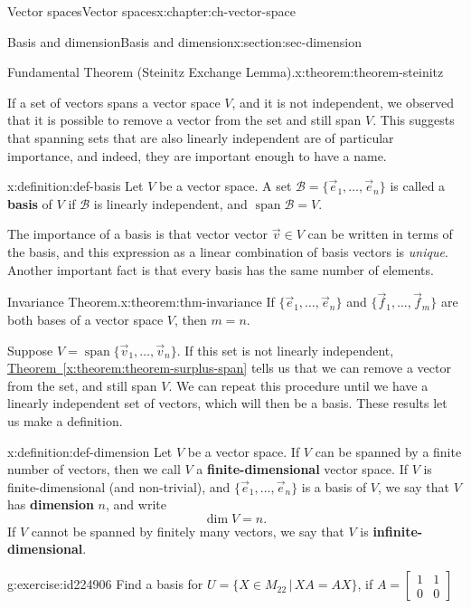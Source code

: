 \documentclass[oneside,10pt,]{book}
\newcommand{\terminology}[1]{\textbf{#1}}
\numberwithin{equation}{section}
\newcommand{\spn}{\operatorname{span}}
\newcommand{\bbm}{\begin{bmatrix}}
\newcommand{\ebm}{\end{bmatrix}}
\newcommand{\amp}{&}
\begin{document}
\begin{chapterptx}{Vector spaces}{}{Vector spaces}{}{}{x:chapter:ch-vector-space}
\begin{sectionptx}{Basis and dimension}{}{Basis and dimension}{}{}{x:section:sec-dimension}
\begin{theorem}{Fundamental Theorem (Steinitz Exchange Lemma).}{}{x:theorem:theorem-steinitz}
\end{theorem}
If a set of vectors spans a vector space \(V\), and it is not independent, we observed that it is possible to remove a vector from the set and still span \(V\). This suggests that spanning sets that are also linearly independent are of particular importance, and indeed, they are important enough to have a name.%
\begin{definition}{}{x:definition:def-basis}%
Let \(V\) be a vector space. A set \(\mathcal{B}=\{\vec{e}_1,\ldots, \vec{e}_n\}\) is called a \terminology{basis} of \(V\) if \(\mathcal{B}\) is linearly independent, and \(\operatorname{span}\mathcal{B} = V\).%
\end{definition}
The importance of a basis is that vector vector \(\vec{v}\in V\) can be written in terms of the basis, and this expression as a linear combination of basis vectors is \emph{unique}. Another important fact is that every basis has the same number of elements.%
\begin{theorem}{Invariance Theorem.}{}{x:theorem:thm-invariance}%
If \(\{\vec{e}_1,\ldots, \vec{e}_n\}\) and \(\{\vec{f}_1,\ldots, \vec{f}_m\}\) are both bases of a vector space \(V\), then \(m=n\).%
\end{theorem}
Suppose \(V=\spn\{\vec{v}_1,\ldots,\vec{v}_n\}\). If this set is not linearly independent, \hyperref[x:theorem:theorem-surplus-span]{Theorem~\ref{x:theorem:theorem-surplus-span}} tells us that we can remove a vector from the set, and still span \(V\). We can repeat this procedure until we have a linearly independent set of vectors, which will then be a basis. These results let us make a definition.%
\begin{definition}{}{x:definition:def-dimension}%
Let \(V\) be a vector space. If \(V\) can be spanned by a finite number of vectors, then we call \(V\) a \terminology{finite-dimensional} vector space. If \(V\) is finite-dimensional (and non-trivial), and \(\{\vec{e}_1,\ldots, \vec{e}_n\}\) is a basis of \(V\), we say that \(V\) has \terminology{dimension} \(n\), and write%
\begin{equation*}
\dim V = n\text{.}
\end{equation*}
If \(V\) cannot be spanned by finitely many vectors, we say that \(V\) is \terminology{infinite-dimensional}.%
\end{definition}
\begin{inlineexercise}{}{g:exercise:id224906}%
Find a basis for \(U=\{X\in M_{22} \,|\, XA = AX\}\), if \(A = \bbm 1\amp 1\\0\amp 0\ebm\)%

\end{inlineexercise}
\end{sectionptx}
\end{chapterptx}
\end{document}
